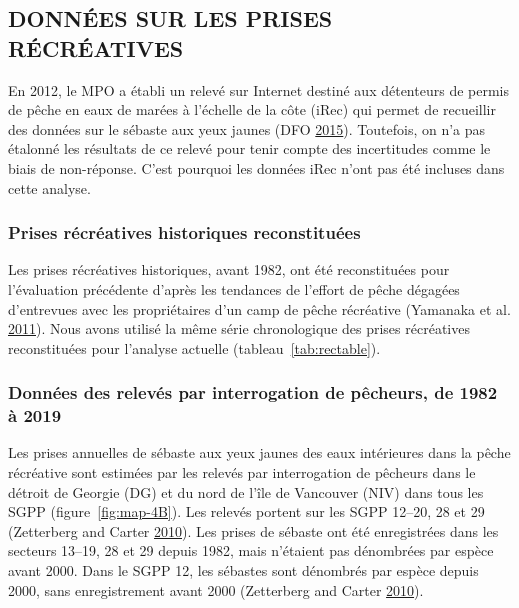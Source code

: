 \documentclass[11pt]{book}
\begin{document}
\hypertarget{sec:rec-catch-data}{%
\subsection{DONNÉES SUR LES PRISES RÉCRÉATIVES}\label{sec:rec-catch-data}}

En 2012, le MPO a établi un relevé sur Internet destiné aux détenteurs de permis de pêche en eaux de marées à l'échelle de la côte (iRec) qui permet de recueillir des données sur le sébaste aux yeux jaunes (DFO \protect\hyperlink{ref-dfo2015}{2015}). Toutefois, on n'a pas étalonné les résultats de ce relevé pour tenir compte des incertitudes comme le biais de non-réponse. C'est pourquoi les données iRec n'ont pas été incluses dans cette analyse.

\hypertarget{sec:recon-rec-catch-data}{%
\subsubsection{Prises récréatives historiques reconstituées}\label{sec:recon-rec-catch-data}}

Les prises récréatives historiques, avant 1982, ont été reconstituées pour l'évaluation précédente d'après les tendances de l'effort de pêche dégagées d'entrevues avec les propriétaires d'un camp de pêche récréative (Yamanaka et al. \protect\hyperlink{ref-yamanaka2011}{2011}). Nous avons utilisé la même série chronologique des prises récréatives reconstituées pour l'analyse actuelle (tableau~\ref{tab:rectable}).

\hypertarget{sec:creel-catch-data}{%
\subsubsection{Données des relevés par interrogation de pêcheurs, de 1982 à 2019}\label{sec:creel-catch-data}}

Les prises annuelles de sébaste aux yeux jaunes des eaux intérieures dans la pêche récréative sont estimées par les relevés par interrogation de pêcheurs dans le détroit de Georgie (DG) et du nord de l'île de Vancouver (NIV) dans tous les SGPP (figure~\ref{fig:map-4B}). Les relevés portent sur les SGPP 12--20, 28 et 29 (Zetterberg and Carter \protect\hyperlink{ref-zetterberg2010}{2010}). Les prises de sébaste ont été enregistrées dans les secteurs 13--19, 28 et 29 depuis 1982, mais n'étaient pas dénombrées par espèce avant 2000. Dans le SGPP 12, les sébastes sont dénombrés par espèce depuis 2000, sans enregistrement avant 2000 (Zetterberg and Carter \protect\hyperlink{ref-zetterberg2010}{2010}).
\end{document}
